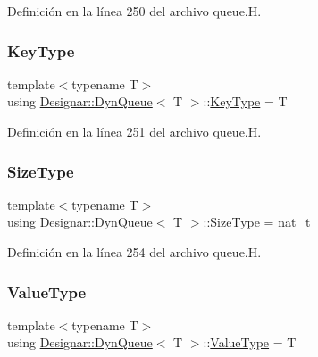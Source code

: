 Definición en la línea 250 del archivo queue.\+H.

\mbox{\label{class_designar_1_1_dyn_queue_a0591681d66d914b3fb11f71d36759984}} 
\subsubsection{\texorpdfstring{Key\+Type}{KeyType}}
{\footnotesize\ttfamily template$<$typename T$>$ \\
using \hyperlink{class_designar_1_1_dyn_queue}{Designar\+::\+Dyn\+Queue}$<$ T $>$\+::\hyperlink{class_designar_1_1_fixed_array_a3a725cf21783340b8aca29dd1db0acf0}{Key\+Type} =  T}



Definición en la línea 251 del archivo queue.\+H.

\mbox{\label{class_designar_1_1_dyn_queue_a376b5cd2f4a47d734fc1e73955197358}} 
\subsubsection{\texorpdfstring{Size\+Type}{SizeType}}
{\footnotesize\ttfamily template$<$typename T$>$ \\
using \hyperlink{class_designar_1_1_dyn_queue}{Designar\+::\+Dyn\+Queue}$<$ T $>$\+::\hyperlink{class_designar_1_1_fixed_array_a503ae414cc313d248e77c08e62ef043c}{Size\+Type} =  \hyperlink{namespace_designar_aa72662848b9f4815e7bf31a7cf3e33d1}{nat\+\_\+t}}



Definición en la línea 254 del archivo queue.\+H.

\mbox{\label{class_designar_1_1_dyn_queue_a6528f67f5ad9ecbe0f8a21b88f3cb832}} 
\subsubsection{\texorpdfstring{Value\+Type}{ValueType}}
{\footnotesize\ttfamily template$<$typename T$>$ \\
using \hyperlink{class_designar_1_1_dyn_queue}{Designar\+::\+Dyn\+Queue}$<$ T $>$\+::\hyperlink{class_designar_1_1_fixed_array_ac1cfeb4403a2dcbffd7ef494e5b873d0}{Value\+Type} =  T}



